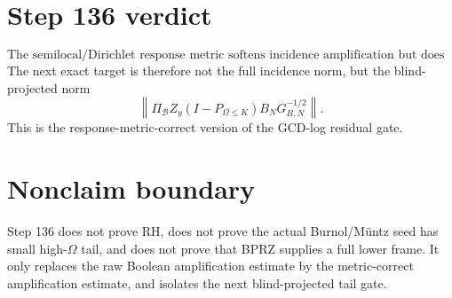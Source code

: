 \documentclass[11pt]{article}
\begin{document}
\section{Step 136 verdict}
\[
\boxed{
\text{The semilocal/Dirichlet response metric softens incidence amplification but does not remove it.}
}
\]
The next exact target is therefore not the full incidence norm, but the blind-projected norm
\[
\boxed{
\left\|\Pi_{\mathcal B}Z_y(I-P_{\Omega\le K})B_NG_{B,N}^{-1/2}\right\|.
}
\]
This is the response-metric-correct version of the GCD-log residual gate.

\section{Nonclaim boundary}
Step 136 does not prove RH, does not prove the actual Burnol/Müntz seed has small high-$\Omega$ tail, and does not prove that BPRZ supplies a full lower frame.  It only replaces the raw Boolean amplification estimate by the metric-correct amplification estimate, and isolates the next blind-projected tail gate.
\end{document}
